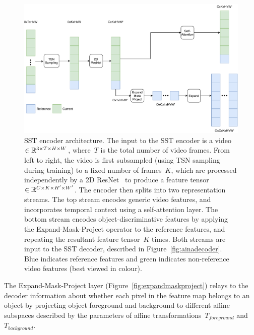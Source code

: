 \begin{figure}
\centering
\includegraphics[scale=0.4]{Figures/aina_encoder}
\caption{SST encoder architecture.
         The input to the SST encoder is a
         video~$\in\mathbb{R}{}^{3\times T \times H\times W}$, where~$T$ is the
         total number of video frames.
         From left to right, the video is first subsampled (using TSN
         sampling~\cite{wang2016temporal} during training) to a fixed number of
         frames~$K$, which are processed independently by a 2D
         ResNet~\cite{he2016deep} to produce a feature tensor~$\in
         \mathbb{R}{}^{C\times K \times H'\times W'}$.
         The encoder then splits into two representation streams.
         The top stream encodes generic video features, and incorporates
         temporal context using a self-attention layer.
         The bottom stream encodes object-discriminative features by applying
         the Expand-Mask-Project operator to the reference features, and
         repeating the resultant feature tensor~$K$ times.
         Both streams are input to the SST decoder, described in
         Figure~\ref{fig:ainadecoder}.
         Blue indicates reference features and green indicates non-reference
         video features (best viewed in colour).}
\label{fig:ainaencoder}
\end{figure}

The Expand-Mask-Project layer (Figure~\ref{fig:expandmaskproject}) relays to
the decoder information about whether each pixel in the feature map belongs to
an object by projecting object foreground and background to different affine
subspaces described by the parameters of affine
transformations~$T_{foreground}$ and~$T_{background}$.

